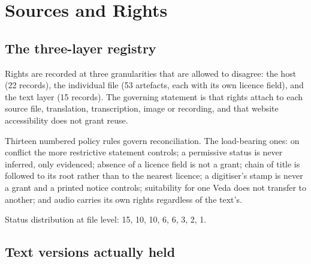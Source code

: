 \section{Sources and Rights}
\label{sec:appendix-sources}

\subsection{The three-layer registry}

Rights are recorded at three granularities that are allowed to disagree: the host
(22 records), the individual file (53 artefacts, each with its own licence field),
and the text layer (15 records). The governing statement is that rights attach to
each source file, translation, transcription, image or recording, and that website
accessibility does not grant reuse.

Thirteen numbered policy rules govern reconciliation. The load-bearing ones: on
conflict the more restrictive statement controls; a permissive status is never
inferred, only evidenced; absence of a licence field is not a grant; chain of title
is followed to its root rather than to the nearest licence; a digitiser's stamp is
never a grant and a printed notice controls; suitability for one Veda does not
transfer to another; and audio carries its own rights regardless of the text's.

Status distribution at file level:  15,  10,
 10,  6,  6,
 3,  2,  1.

\subsection{Text versions actually held}

